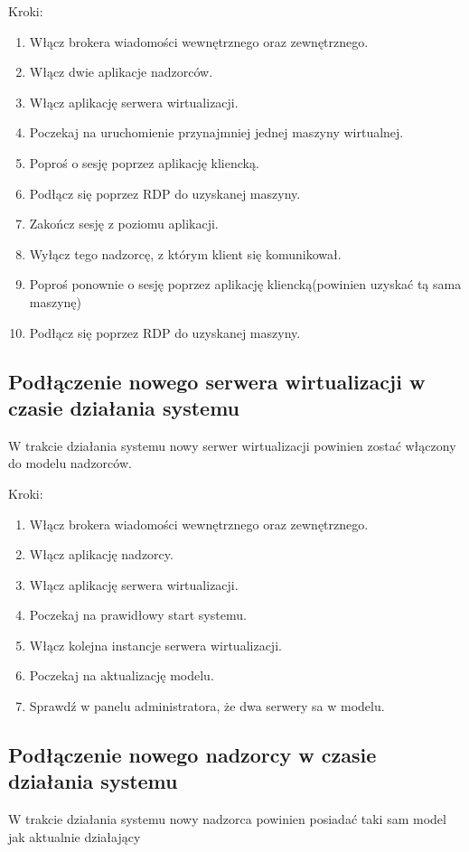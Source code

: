 \documentclass[12pt]{article}
\begin{document}
Kroki:
\begin{enumerate}
	\item Włącz brokera wiadomości wewnętrznego oraz zewnętrznego.
	\item Włącz dwie aplikacje nadzorców.
	\item Włącz aplikację serwera wirtualizacji.
	\item Poczekaj na uruchomienie przynajmniej jednej maszyny wirtualnej.
	\item Poproś o sesję poprzez aplikację kliencką.
	\item Podłącz się poprzez RDP do uzyskanej maszyny.
	\item Zakończ sesję z poziomu aplikacji.
	\item Wyłącz tego nadzorcę, z którym klient się komunikował.
	\item Poproś ponownie o sesję poprzez aplikację kliencką(powinien uzyskać tą sama maszynę)
	\item Podłącz się poprzez RDP do uzyskanej maszyny.
\end{enumerate}

\subsection {Podłączenie nowego serwera wirtualizacji w czasie działania systemu}
W trakcie działania systemu nowy serwer wirtualizacji powinien zostać włączony do modelu nadzorców.

Kroki:
\begin{enumerate}
	\item Włącz brokera wiadomości wewnętrznego oraz zewnętrznego.
	\item Włącz aplikację nadzorcy.
	\item Włącz aplikację serwera wirtualizacji.
	\item Poczekaj na prawidłowy start systemu.
	\item Włącz kolejna instancje serwera wirtualizacji.
	\item Poczekaj na aktualizację modelu.
	\item Sprawdź w panelu administratora, że dwa serwery sa w modelu.
\end{enumerate}

\subsection {Podłączenie nowego nadzorcy w czasie działania systemu}
W trakcie działania systemu nowy nadzorca powinien posiadać taki sam model jak aktualnie działający
\end{document}
